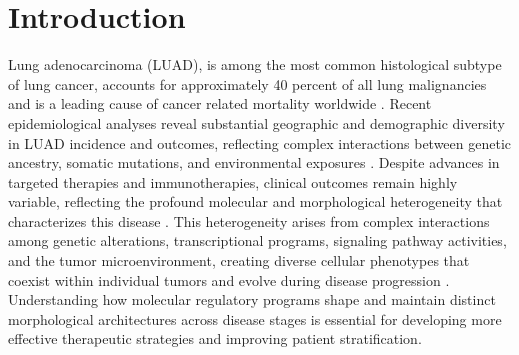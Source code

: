 \documentclass[pdflatex,article,12pt]{article}
\begin{document}
\section{Introduction}

Lung adenocarcinoma (LUAD), is among the most common histological subtype of lung cancer, accounts for approximately 40 percent of all lung malignancies and is a leading cause of cancer related mortality worldwide \cite{gridelli2015non, siegel2023cancer}. Recent epidemiological analyses reveal substantial geographic and demographic diversity in LUAD incidence and outcomes, reflecting complex interactions between genetic ancestry, somatic mutations, and environmental exposures \cite{gillette2025proteogenomic}. Despite advances in targeted therapies and immunotherapies, clinical outcomes remain highly variable, reflecting the profound molecular and morphological heterogeneity that characterizes this disease \cite{xu2023identification,li2024advancing,han2024integration}. This heterogeneity arises from complex interactions among genetic alterations, transcriptional programs, signaling pathway activities, and the tumor microenvironment, creating diverse cellular phenotypes that coexist within individual tumors and evolve during disease progression \cite{imielinski2012genomic,van2023spatial}. Understanding how molecular regulatory programs shape and maintain distinct morphological architectures across disease stages is essential for developing more effective therapeutic strategies and improving patient stratification.
\end{document}
